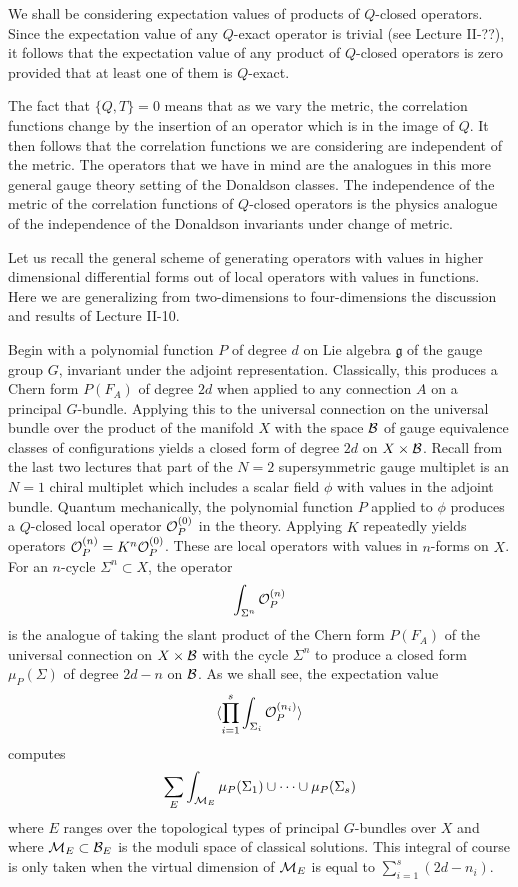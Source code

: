 \documentclass[10pt]{article}
\begin{document}
We shall be considering expectation values of products of $Q$-closed
operators. Since the expectation value of any $Q$-exact operator is
trivial (see  Lecture II-??), it follows that the expectation value of any
product of $Q$-closed operators is zero provided that at least one of
them is $Q$-exact.

The fact that $\{Q,T\}=0$ means
that as we vary the metric, the correlation functions change by
the insertion of an operator which is in the image of $Q$.
It then follows that 
the correlation functions we are considering are
independent of the metric.
The operators that we have in mind are the analogues in this more
general gauge theory setting of the Donaldson classes. 
The independence of the metric of the correlation functions of
$Q$-closed operators  is the physics analogue of
the independence of the Donaldson invariants under change of metric.


Let us recall the general scheme of generating operators with values
in higher dimensional differential forms out of local operators with
values in functions.
Here we are generalizing from two-dimensions to four-dimensions the
discussion and results of Lecture II-10.  


Begin with a polynomial function $P$ of degree $d$ on Lie algebra
$\mathfrak{g}$ of the gauge group $G$,
invariant under the adjoint representation. Classically, this produces
a Chern form $P(F_A)$ of degree $2d$ when applied to any connection
$A$ on a principal $G$-bundle. Applying this to the universal
connection on the universal bundle 
over the product of the manifold $X$ with the space ${\cal B}$ of
gauge equivalence classes of configurations yields a closed form of
degree $2d$ on $X\times {\cal B}$. Recall from the last two lectures
that part of the $N=2$ supersymmetric gauge multiplet is an $N=1$
chiral multiplet which includes a scalar field $\phi$ with values in the
adjoint bundle. Quantum mechanically, the
polynomial function $P$ applied to $\phi$ produces a $Q$-closed local
operator ${\cal O}_P^{(0)}$ in the theory.  Applying $K$ repeatedly 
yields operators ${\cal O}_P^{(n)}=K^n{\cal O}_P^{(0)}$.  These are
local operators with values in $n$-forms on $X$. 
For an $n$-cycle $\Sigma^n\subset X$, the operator
$$\int_{\Sigma^n}{\cal O}^{(n)}_P$$
is the analogue of taking the slant product of the Chern form $P(F_A)$
of the universal connection on $X\times {\cal B}$ with the cycle
$\Sigma^n$ to produce a closed form $\mu_P(\Sigma)$ of degree $2d-n$
on ${\cal B}$.  As we shall see, the expectation value
$$\langle \prod_{i=1}^s\int_{\Sigma_i}{\cal O}_P^{(n_i)}\rangle $$
computes 
$$\sum_E\int_{{\cal M}_E}\mu_P(\Sigma_1)\cup\cdots\cup \mu_P(\Sigma_s)$$
where $E$ ranges over the topological types of principal $G$-bundles
over $X$ and where ${\cal M}_E\subset {\cal B}_E$ is the moduli space
of classical solutions.  This integral of course is only taken when
the virtual dimension of ${\cal M}_E$ is equal to
$\sum_{i=1}^s(2d-n_i)$. 
\end{document}
